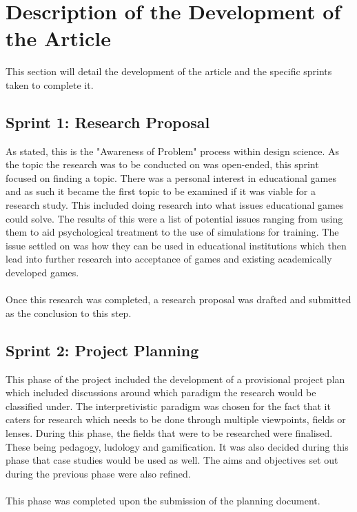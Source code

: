 \newpage
\section{Description of the Development of the Article}
This section will detail the development of the article and the specific sprints taken to complete it. 

\subsection{Sprint 1: Research Proposal}
As stated, this is the "Awareness of Problem" process within design science. As the topic the research was to be conducted on was open-ended, this sprint focused on finding a topic. There was a personal interest in educational games and as such it became the first topic to be examined if it was viable for a research study. This included doing research into what issues educational games could solve. The results of this were a list of potential issues ranging from using them to aid psychological treatment to the use of simulations for training. The issue settled on was how they can be used in educational institutions which then lead into further research into acceptance of games and existing academically developed games. 
\\\\
Once this research was completed, a research proposal was drafted and submitted as the conclusion to this step.

\subsection{Sprint 2: Project Planning}
This phase of the project included the development of a provisional project plan which included discussions around which paradigm the research would be classified under. The interpretivistic paradigm was chosen for the fact that it caters for research which needs to be done through multiple viewpoints, fields or lenses. During this phase, the fields that were to be researched were finalised. These being pedagogy, ludology and gamification. It was also decided during this phase that case studies would be used as well. The aims and objectives set out during the previous phase were also refined.
\\\\
This phase was completed upon the submission of the planning document.

